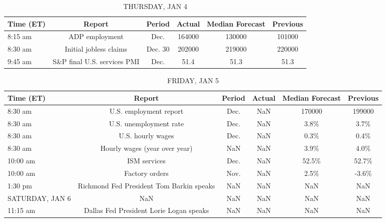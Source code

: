 \documentclass{article}%
\begin{document}
%


\begin{table}[htbp]%
\caption{THURSDAY, JAN 4}%
\centering%
\begin{adjustbox}{width=1\textwidth}%
\begin{tabular}{lccccc}
\toprule
Time (ET) &                      Report &  Period & Actual & Median Forecast & Previous \\
\midrule
  8:15 am &              ADP employment &    Dec. & 164000 &          130000 &   101000 \\
  8:30 am &      Initial jobless claims & Dec. 30 & 202000 &          219000 &   220000 \\
  9:45 am & S\&P final U.S. services PMI &    Dec. &   51.4 &            51.3 &     51.3 \\
\bottomrule
\end{tabular}
%
\end{adjustbox}%
\end{table}

%


\begin{table}[htbp]%
\caption{FRIDAY, JAN 5}%
\centering%
\begin{adjustbox}{width=1\textwidth}%
\begin{tabular}{lccccc}
\toprule
      Time (ET) &                                   Report & Period & Actual & Median Forecast & Previous \\
\midrule
        8:30 am &                   U.S. employment report &   Dec. &    NaN &          170000 &   199000 \\
        8:30 am &                   U.S. unemployment rate &   Dec. &    NaN &            3.8\% &     3.7\% \\
        8:30 am &                        U.S. hourly wages &   Dec. &    NaN &            0.3\% &     0.4\% \\
        8:30 am &            Hourly wages (year over year) &    NaN &    NaN &            3.9\% &     4.0\% \\
       10:00 am &                             ISM services &   Dec. &    NaN &           52.5\% &    52.7\% \\
       10:00 am &                           Factory orders &   Nov. &    NaN &            2.5\% &    -3.6\% \\
        1:30 pm & Richmond Fed President Tom Barkin speaks &    NaN &    NaN &             NaN &      NaN \\
SATURDAY, JAN 6 &                                      NaN &    NaN &    NaN &             NaN &      NaN \\
       11:15 am &  Dallas Fed President Lorie Logan speaks &    NaN &    NaN &             NaN &      NaN \\
\bottomrule
\end{tabular}
%
\end{adjustbox}%
\end{table}
\end{document}
